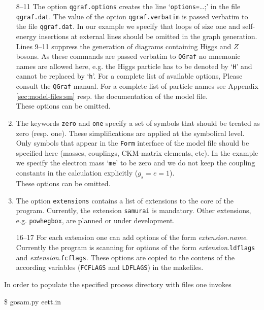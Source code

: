\documentclass[11pt,a4paper]{refrep}
\newcommand{\qgraf}{{\tt QGraf}\xspace}
\newcommand{\form}{{\tt Form}\xspace}
\begin{document}
\begin{enumerate}
The value of this option is
translated into a \texttt{vsum} constraint in the file \texttt{qgraf.dat}.
\\This option is mandatory.
\item[8--11] The option
\texttt{qgraf.options} creates the line
`\lstinline[basicstyle=\ttfamily]{options=}\dots;' in the file
\texttt{qgraf.dat}. The value of the option \texttt{qgraf.verbatim} is
passed verbatim to the file \texttt{qgraf.dat}.
In our example we specify that loops of size one and self-energy insertions
at external lines should be omitted in the graph generation. Lines
9--11 suppress the generation of diagrams containing Higgs and $Z$ bosons.
\attention As these commands are passed verbatim to \qgraf no mnemonic names
are allowed here, e.g. the Higgs particle has to be denoted by
`\lstinline[basicstyle=\ttfamily]{H}' and cannot be replaced by
`\lstinline[basicstyle=\ttfamily]{h}'.
For a complete list of available options, Please consult the
\qgraf manual. For a complete list of particle names see 
Appendix \ref{sec:model-files:sm} resp. the
documentation of the model file.
\\These options can be omitted.
\item[12--13] The keywords \texttt{zero} and \texttt{one} specify
a set of symbols that should be treated as zero (resp. one). These
simplifications are applied at the symbolical level. Only symbols
that appear in the \form interface of the model file should be
specified here (masses, couplings, CKM-matrix elements, etc).
In the example we specify the electron mass
`\lstinline[basicstyle=\ttfamily]{me}' to be zero and we do not keep
the coupling constants in the calculation explicitly ($g_s=e=1$).
\\These options can be omitted.
\item[15] The option \texttt{extensions} contains a list of extensions
to the core of the program. Currently, the extension \texttt{samurai}
is mandatory. Other extensions, e.g. \texttt{powhegbox}, are planned
or under development.
\item[16--17] For each extension one can add options of the form
\textit{extension}{.}\textit{name}. Currently the program is scanning
for options of the form \textit{extension}{.}\texttt{ldflags} and
\textit{extension}{.}\texttt{fcflags}. These options are copied
to the contens of the according variables (\texttt{FCFLAGS} and
\texttt{LDFLAGS}) in the makefiles.
\end{enumerate}

In order to populate the specified process directory with files
one invokes
\begin{example}
\$ gosam.py eett.in
\end{example}
\end{document}
